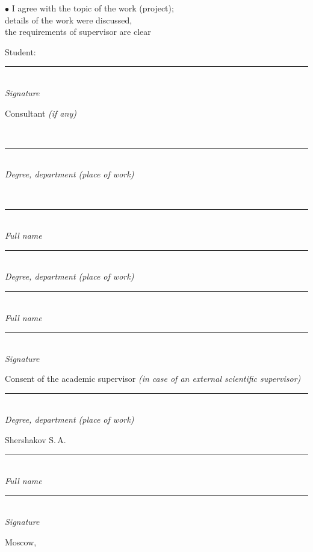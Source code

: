 \documentclass[12pt,a4paper]{article}
\newcommand{\hseSignField}[2]{%
  \begin{minipage}[t]{#1}\centering
    \rule{\linewidth}{0.4pt}\\[-2pt]{\footnotesize\itshape #2}
  \end{minipage}}
\newcommand{\hseFilledField}[3]{%
  \begin{minipage}[t]{#1}\centering
    {\small #2}\\[-4pt]\rule{\linewidth}{0.4pt}\\[-2pt]{\footnotesize\itshape #3}
  \end{minipage}}
\begin{document}
\begin{otherlanguage}{english}
\vspace{0.5cm}
\begin{minipage}[t]{0.55\textwidth}
$\bullet$ I agree with the topic of the work (project);\\
details of the work were discussed,\\
the requirements of supervisor are clear
\end{minipage}\hfill
\begin{minipage}[t]{0.4\textwidth}
\vspace{0.5cm}
Student: \hfill \hseSignField{0.5\textwidth}{Signature}
\end{minipage}

\vspace{0.5cm}
\begin{minipage}[t]{0.27\textwidth}\raggedright Consultant {\itshape(if any)}\end{minipage}%
\ifhseHasCoSupervisor
\hseFilledField{0.3\textwidth}{\foreignlanguage{russian}{\hseCoSupervisorTitle\ifdefempty{\hseCoSupervisorDegree}{}{, \hseCoSupervisorDegree}}}{Degree, department (place of work)}\hfill
\hseFilledField{0.22\textwidth}{\foreignlanguage{russian}{\hseCoSupervisorName}}{Full name}\hfill
\else
\hseSignField{0.3\textwidth}{Degree, department (place of work)}\hfill
\hseSignField{0.22\textwidth}{Full name}\hfill
\fi
\hseSignField{0.15\textwidth}{Signature}

\vspace{0.5cm}
\begin{minipage}[t]{0.27\textwidth}\raggedright Consent of the academic supervisor {\itshape(in case of an external scientific supervisor)}\end{minipage}%
\hseSignField{0.3\textwidth}{Degree, department (place of work)}\hfill
\hseFilledField{0.22\textwidth}{Shershakov S.\,A.}{Full name}\hfill
\hseSignField{0.15\textwidth}{Signature}

\vfill
\begin{center}Moscow, \the\year\end{center}
\end{otherlanguage}
\end{document}
